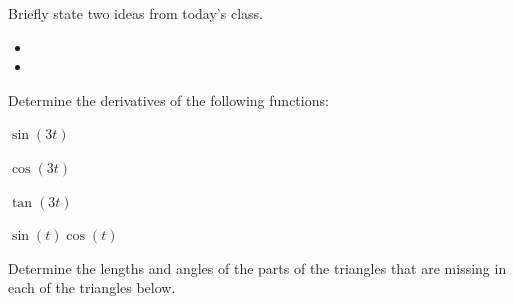 \postClass

\begin{problem}
\item Briefly state two ideas from today's class.
  \begin{itemize}
  \item 
  \item 
  \end{itemize}
\item 
  \begin{subproblem}
    \item
  \end{subproblem}
\end{problem}


\begin{problem}
\item Determine the derivatives of the following functions:
  \begin{subproblem}
  \item $\sin(3t)$
    \vfill
  \item $\cos(3t)$
    \vfill
  \item $\tan(3t)$
    \vfill
  \item $\sin(t)\cos(t)$
    \vfill
  \end{subproblem}

  \clearpage

\item Determine the lengths and angles of the parts of the triangles
  that are missing in each of the triangles below.

  \scalebox{0.5}{}

  \vfill

\end{problem}

